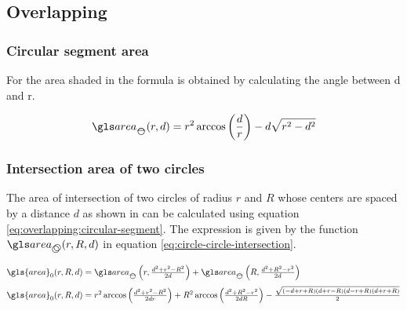 \begin{appendix}
\subsection{Overlapping}\label{sec:overlapping}

\subsubsection{Circular segment area}

For the area shaded in  the formula is obtained by calculating the angle between d and r.

\begin{minipage}{0.5\linewidth}
\end{minipage}%
\begin{minipage}{0.5\linewidth}
  \begin{equation}\label{eq:overlapping:circular-segment}
    \cirseg(r, d) =
      r^2 \arccos\left( \frac{d}{r} \right) - d \sqrt{r^2 - d^2}
  \end{equation}
\end{minipage}%

\subsubsection{Intersection area of two circles}\label{sec:circle-circle-intersection}

The area of intersection of two circles of radius \( r \) and \( R \) whose centers are spaced by a distance \( d \) as shown in  can be calculated using equation \eqref{eq:overlapping:circular-segment}. The expression is given by the function \( \circir (r, R, d) \) in equation \eqref{eq:circle-circle-intersection}.

\begin{align}
  \gls{area}_0 (r, R, d) & =
    \textstyle
    \cirseg \left(r, \frac{d^2 + r^2 - R^2}{2 d} \right) + \cirseg \left( R, \frac{d^2 + R^2 - r^2}{2 d} \right)
  \\[1mm]
  \gls{area}_0 (r, R, d) & =
    \textstyle
    r^2 \arccos \left( \frac{d^2 + r^2 - R^2}{2 d r} \right)
    + R^2 \arccos \left( \frac{d^2 + R^2 - r^2}{2 d R} \right)
    - \frac{\sqrt{(-d+r+R)(d+r-R)(d-r+R)(d+r+R)}}{2}
\end{align}


\end{appendix}
